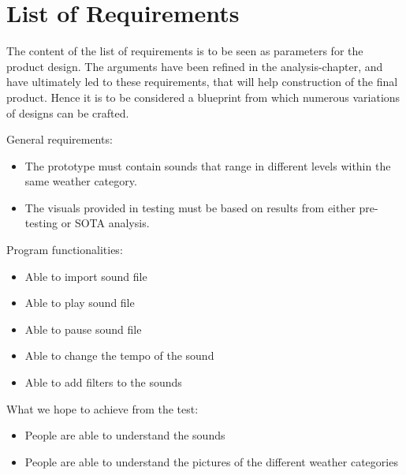 
\section{List of Requirements} %
\label{sec:list_of_requirements}

The content of the list of requirements is to be seen as parameters for the product design. 
The arguments have been refined in the analysis-chapter, and have ultimately led to these requirements, that will help construction of the final product. 
Hence it is to be considered a blueprint from which numerous variations of designs can be crafted.

General requirements:
\begin{itemize}
    \item The prototype must contain sounds that range in different levels within the same weather category.
    \item The visuals provided in testing must be based on results from either pre-testing or SOTA analysis.
\end{itemize}

Program functionalities:
\begin{itemize}
    \item Able to import sound file
    \item Able to play sound file
    \item Able to pause sound file
    \item Able to change the tempo of the sound
    \item Able to add filters to the sounds
\end{itemize}

What we hope to achieve from the test:

\begin{itemize}
    \item People are able to understand the sounds
    \item People are able to understand the pictures of the different weather categories
\end{itemize}
